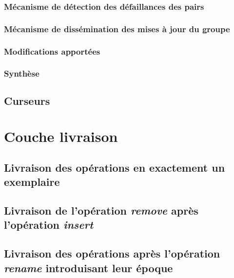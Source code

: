 \subsubsection{Mécanisme de détection des défaillances des pairs}


\subsubsection{Mécanisme de dissémination des mises à jour du groupe}


\subsubsection{Modifications apportées}


\subsubsection{Synthèse}


\subsection{Curseurs}


\section{Couche livraison}
\label{sec:mute-livraison}



\subsection{Livraison des opérations en exactement un exemplaire}


\subsection{Livraison de l'opération \emph{remove} après l'opération \emph{insert}}


\subsection{Livraison des opérations après l'opération \emph{rename} introduisant leur époque}


